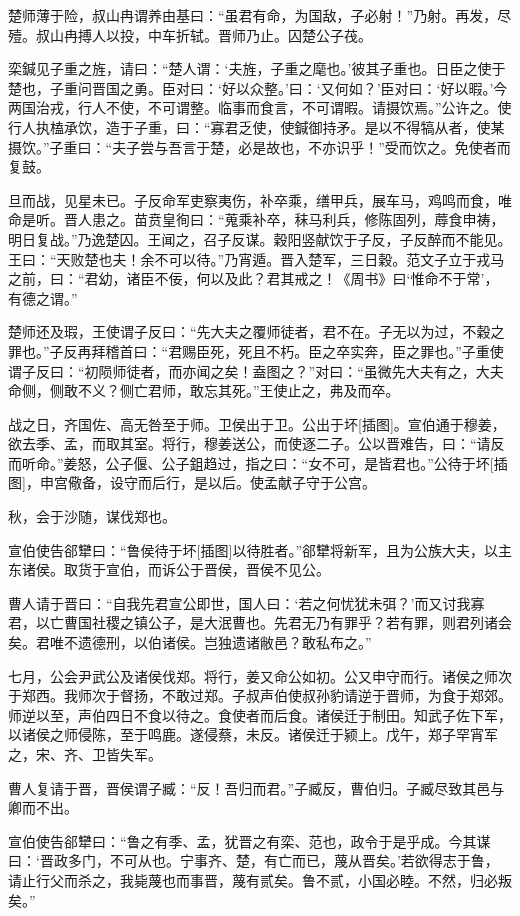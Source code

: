 \documentclass[a4paper,12pt,UTF8,twoside]{ctexbook}
\begin{document}
楚师薄于险，叔山冉谓养由基曰：“虽君有命，为国敌，子必射！”乃射。再发，尽殪。叔山冉搏人以投，中车折轼。晋师乃止。囚楚公子茷。

栾鍼见子重之旌，请曰：“楚人谓：‘夫旌，子重之麾也。’彼其子重也。日臣之使于楚也，子重问晋国之勇。臣对曰：‘好以众整。’曰：‘又何如？’臣对曰：‘好以暇。’今两国治戎，行人不使，不可谓整。临事而食言，不可谓暇。请摄饮焉。”公许之。使行人执榼承饮，造于子重，曰：“寡君乏使，使鍼御持矛。是以不得犒从者，使某摄饮。”子重曰：“夫子尝与吾言于楚，必是故也，不亦识乎！”受而饮之。免使者而复鼓。

旦而战，见星未已。子反命军吏察夷伤，补卒乘，缮甲兵，展车马，鸡鸣而食，唯命是听。晋人患之。苗贲皇徇曰：“蒐乘补卒，秣马利兵，修陈固列，蓐食申祷，明日复战。”乃逸楚囚。王闻之，召子反谋。穀阳竖献饮于子反，子反醉而不能见。王曰：“天败楚也夫！余不可以待。”乃宵遁。晋入楚军，三日穀。范文子立于戎马之前，曰：“君幼，诸臣不佞，何以及此？君其戒之！《周书》曰‘惟命不于常’，有德之谓。”

楚师还及瑕，王使谓子反曰：“先大夫之覆师徒者，君不在。子无以为过，不穀之罪也。”子反再拜稽首曰：“君赐臣死，死且不朽。臣之卒实奔，臣之罪也。”子重使谓子反曰：“初陨师徒者，而亦闻之矣！盍图之？”对曰：“虽微先大夫有之，大夫命侧，侧敢不义？侧亡君师，敢忘其死。”王使止之，弗及而卒。

战之日，齐国佐、高无咎至于师。卫侯出于卫。公出于坏[插图]。宣伯通于穆姜，欲去季、孟，而取其室。将行，穆姜送公，而使逐二子。公以晋难告，曰：“请反而听命。”姜怒，公子偃、公子鉏趋过，指之曰：“女不可，是皆君也。”公待于坏[插图]，申宫儆备，设守而后行，是以后。使孟献子守于公宫。

秋，会于沙随，谋伐郑也。

宣伯使告郤犫曰：“鲁侯待于坏[插图]以待胜者。”郤犫将新军，且为公族大夫，以主东诸侯。取货于宣伯，而诉公于晋侯，晋侯不见公。

曹人请于晋曰：“自我先君宣公即世，国人曰：‘若之何忧犹未弭？’而又讨我寡君，以亡曹国社稷之镇公子，是大泯曹也。先君无乃有罪乎？若有罪，则君列诸会矣。君唯不遗德刑，以伯诸侯。岂独遗诸敝邑？敢私布之。”

七月，公会尹武公及诸侯伐郑。将行，姜又命公如初。公又申守而行。诸侯之师次于郑西。我师次于督扬，不敢过郑。子叔声伯使叔孙豹请逆于晋师，为食于郑郊。师逆以至，声伯四日不食以待之。食使者而后食。诸侯迁于制田。知武子佐下军，以诸侯之师侵陈，至于鸣鹿。遂侵蔡，未反。诸侯迁于颍上。戊午，郑子罕宵军之，宋、齐、卫皆失军。

曹人复请于晋，晋侯谓子臧：“反！吾归而君。”子臧反，曹伯归。子臧尽致其邑与卿而不出。

宣伯使告郤犫曰：“鲁之有季、孟，犹晋之有栾、范也，政令于是乎成。今其谋曰：‘晋政多门，不可从也。宁事齐、楚，有亡而已，蔑从晋矣。’若欲得志于鲁，请止行父而杀之，我毙蔑也而事晋，蔑有贰矣。鲁不贰，小国必睦。不然，归必叛矣。”
\end{document}
